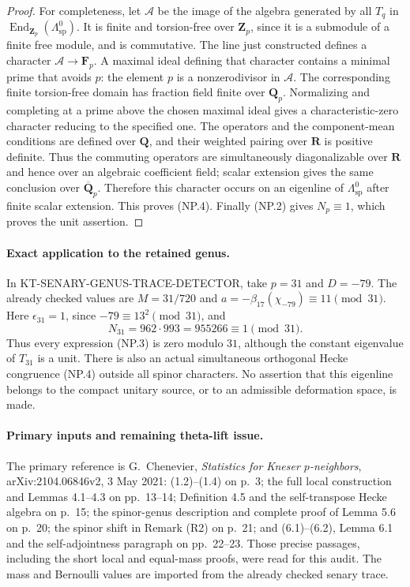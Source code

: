 \begin{proof}
For completeness, let $\mathcal A$ be the image of the algebra generated
by all $T_q$ in $\operatorname{End}_{\mathbf Z_p}(\Lambda^0_{\mathrm{sp}})$.
It is finite and torsion-free over $\mathbf Z_p$, since it is a
submodule of a finite free module, and is commutative.  The line just
constructed defines a character $\mathcal A\to\mathbf F_p$.
A maximal ideal defining that character contains a minimal prime that
avoids $p$: the element $p$ is a nonzerodivisor in $\mathcal A$.
The corresponding finite torsion-free domain has fraction field finite
over $\mathbf Q_p$.  Normalizing and completing at a prime above the
chosen maximal ideal gives a characteristic-zero character reducing to
the specified one.  The operators and the component-mean conditions
are defined over $\mathbf Q$, and their weighted pairing over $\mathbf R$
is positive definite.  Thus the commuting operators are simultaneously
diagonalizable over $\mathbf R$ and hence over an algebraic coefficient
field; scalar extension gives the same conclusion over $\overline{\mathbf Q}_p$.
Therefore this character
occurs on an eigenline of $\Lambda^0_{\mathrm{sp}}$ after finite scalar
extension.  This proves (NP.4).  Finally (NP.2) gives $N_p\equiv1$,
which proves the unit assertion.
\end{proof}

\paragraph{Exact application to the retained genus.}
In KT-SENARY-GENUS-TRACE-DETECTOR, take $p=31$ and $D=-79$.
The already checked values are $M=31/720$ and
$a=-\beta_{17}(\chi_{-79})\equiv11\pmod{31}$.
Here $\epsilon_{31}=1$, since $-79\equiv13^2\pmod{31}$, and
\[
                  N_{31}=962\cdot993=955266\equiv1\pmod{31}.
\]
Thus every expression (NP.3) is zero modulo $31$, although the
constant eigenvalue of $T_{31}$ is a unit.  There is also an actual
simultaneous orthogonal Hecke congruence (NP.4) outside all spinor
characters.  No assertion that this eigenline belongs to the compact
unitary source, or to an admissible deformation space, is made.

\paragraph{Primary inputs and remaining theta-lift issue.}
The primary reference is G.~Chenevier, \emph{Statistics for Kneser
$p$-neighbors}, arXiv:2104.06846v2, 3 May 2021: (1.2)--(1.4) on
p.~3; the full local construction and Lemmas 4.1--4.3 on pp.~13--14;
Definition 4.5 and the self-transpose Hecke algebra on p.~15;
the spinor-genus description and complete proof of Lemma 5.6 on
p.~20; the spinor shift in Remark (R2) on p.~21; and (6.1)--(6.2),
Lemma 6.1 and the self-adjointness paragraph on pp.~22--23.
Those precise passages, including the short local and equal-mass
proofs, were read for this audit.  The mass and Bernoulli values are
imported from the already checked senary trace.


